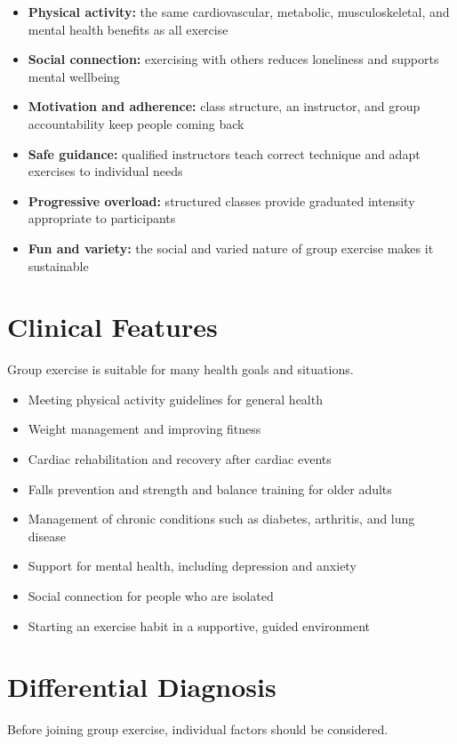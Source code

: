 \begin{itemize}
    \item \textbf{Physical activity:} the same cardiovascular, metabolic, musculoskeletal, and mental health benefits as all exercise
    \item \textbf{Social connection:} exercising with others reduces loneliness and supports mental wellbeing
    \item \textbf{Motivation and adherence:} class structure, an instructor, and group accountability keep people coming back
    \item \textbf{Safe guidance:} qualified instructors teach correct technique and adapt exercises to individual needs
    \item \textbf{Progressive overload:} structured classes provide graduated intensity appropriate to participants
    \item \textbf{Fun and variety:} the social and varied nature of group exercise makes it sustainable
\end{itemize}

\section*{Clinical Features}
Group exercise is suitable for many health goals and situations.

\begin{itemize}
    \item Meeting physical activity guidelines for general health
    \item Weight management and improving fitness
    \item Cardiac rehabilitation and recovery after cardiac events
    \item Falls prevention and strength and balance training for older adults
    \item Management of chronic conditions such as diabetes, arthritis, and lung disease
    \item Support for mental health, including depression and anxiety
    \item Social connection for people who are isolated
    \item Starting an exercise habit in a supportive, guided environment
\end{itemize}

\section*{Differential Diagnosis}
Before joining group exercise, individual factors should be considered.

